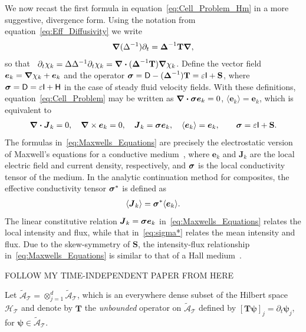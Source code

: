 \documentclass[leqno,onefignum,onetabnum]{siamltex1213}
\newcommand{\Tb}{\mathbf{T}}
\newcommand{\Sb}{\mathbf{S}}
\newcommand{\Tc}{\mathcal{T}}
\newcommand{\Hc}{\mathcal{H}}
\newcommand{\Ac}{\mathcal{A}}
\newcommand{\Dm}{\mathsf{D}}
\newcommand{\Hm}{\mathsf{H}}
\newcommand{\Ib}{\mathsf{I}}
\newcommand{\As}{\mathscr{A}}
\newcommand\bsig{\mbox{\boldmath${\sigma}$}}
\newcommand\bDelta{\mbox{\boldmath${\Delta}$}}
\newcommand\bnabla{\mbox{\boldmath${\nabla}$}}
\providecommand\bcdot{\boldsymbol{\cdot}}
\newcommand{\vecJ}{\boldsymbol{J}}
\newcommand{\vece}{\boldsymbol{e}}
\newcommand{\vecpsi}{\boldsymbol{\psi}}
\begin{document}
We now recast the first formula in equation~\eqref{eq:Cell_Problem_Hm}
in a more suggestive, divergence form. Using the notation from
equation~\eqref{eq:Eff_Diffusivity} we write  
%
\begin{align}\label{eq:Dt_T}
  \bnabla(\Delta^{-1})\partial_t=\bDelta^{-1}\Tb\bnabla ,
\end{align}
%
so that~\cite{Fannjiang:1994:SIAM_JAM:333}
$\partial_t\chi_k=\Delta\Delta^{-1}\partial_t\chi_k=\bnabla \bcdot(\bDelta^{-1}\Tb)\bnabla \chi_k$. Define the  
vector field $\vece _k=\bnabla \chi_k+\vece _k$ and the operator
$\bsig=\Dm-(\bDelta^{-1})\Tb=\varepsilon\Ib+\Sb$, where
$\bsig=\Dm=\varepsilon\Ib+\Hm$ in the case of steady fluid velocity
fields. With these definitions, equation~\eqref{eq:Cell_Problem} may
be written as  $\bnabla \bcdot\bsig\vece _k=0$, $\langle\vece _k\rangle=\vece _k$,
which is equivalent to    
%
\begin{align}\label{eq:Maxwells_Equations}    
  \bnabla \bcdot\vecJ_k=0, \quad
  \bnabla \times\vece _k=0, \quad
  \vecJ_k=\bsig\vece _k,\quad
  \langle\vece _k\rangle=\vece _k,\qquad
  \bsig%
       =\varepsilon\Ib+\Sb.
\end{align}
%
The formulas in~\eqref{eq:Maxwells_Equations} are precisely the
electrostatic version of Maxwell's equations for a conductive
medium~\cite{Golden:CMP-473}, where $\vece _k$ and $\vecJ_k$ are the
local 
electric field and current density, respectively, and $\bsig$ is the
local conductivity tensor of the medium. In the analytic continuation method for composites,
the effective conductivity tensor $\bsig^*$ is defined as
% 
\begin{align}%
  \langle\vecJ_k\rangle=\bsig^*\langle\vece _k\rangle.
\end{align}
%
The linear constitutive relation $\vecJ_k=\bsig\vece _k$
in~\eqref{eq:Maxwells_Equations} relates the local intensity and flux, 
while that in~\eqref{eq:sigma*} relates the mean intensity and
flux. Due to the skew-symmetry of $\Sb$, the intensity-flux
relationship in~\eqref{eq:Maxwells_Equations} is similar to that of a
Hall medium~\cite{Isichenko:JNS:1991:375}.



FOLLOW MY TIME-INDEPENDENT PAPER FROM HERE


Let $\tilde{\Ac}_{\Tc}=\otimes_{j=1}^d\tilde{\As}_{\Tc}$, which is an everywhere 
dense subset of the Hilbert space $\Hc_{\Tc}$ and denote by $\Tb$ the \emph{unbounded}
operator on $\tilde{\Ac}_{\Tc}$ defined by $[\Tb\vecpsi]_j=\partial_t\vecpsi_j$, for 
$\vecpsi\in\tilde{\Ac}_{\Tc}$.
\end{document}
